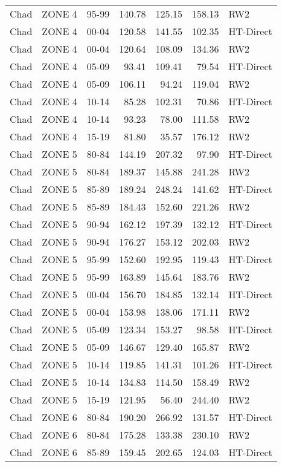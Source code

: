 \begin{longtable}{lllrrrl}
  Chad & ZONE 4 & 95-99 & 140.78 & 125.15 & 158.13 & RW2 \\ 
  Chad & ZONE 4 & 00-04 & 120.58 & 141.55 & 102.35 & HT-Direct \\ 
  Chad & ZONE 4 & 00-04 & 120.64 & 108.09 & 134.36 & RW2 \\ 
  Chad & ZONE 4 & 05-09 & 93.41 & 109.41 & 79.54 & HT-Direct \\ 
  Chad & ZONE 4 & 05-09 & 106.11 & 94.24 & 119.04 & RW2 \\ 
  Chad & ZONE 4 & 10-14 & 85.28 & 102.31 & 70.86 & HT-Direct \\ 
  Chad & ZONE 4 & 10-14 & 93.23 & 78.00 & 111.58 & RW2 \\ 
  Chad & ZONE 4 & 15-19 & 81.80 & 35.57 & 176.12 & RW2 \\ 
  Chad & ZONE 5 & 80-84 & 144.19 & 207.32 & 97.90 & HT-Direct \\ 
  Chad & ZONE 5 & 80-84 & 189.37 & 145.88 & 241.28 & RW2 \\ 
  Chad & ZONE 5 & 85-89 & 189.24 & 248.24 & 141.62 & HT-Direct \\ 
  Chad & ZONE 5 & 85-89 & 184.43 & 152.60 & 221.26 & RW2 \\ 
  Chad & ZONE 5 & 90-94 & 162.12 & 197.39 & 132.12 & HT-Direct \\ 
  Chad & ZONE 5 & 90-94 & 176.27 & 153.12 & 202.03 & RW2 \\ 
  Chad & ZONE 5 & 95-99 & 152.60 & 192.95 & 119.43 & HT-Direct \\ 
  Chad & ZONE 5 & 95-99 & 163.89 & 145.64 & 183.76 & RW2 \\ 
  Chad & ZONE 5 & 00-04 & 156.70 & 184.85 & 132.14 & HT-Direct \\ 
  Chad & ZONE 5 & 00-04 & 153.98 & 138.06 & 171.11 & RW2 \\ 
  Chad & ZONE 5 & 05-09 & 123.34 & 153.27 & 98.58 & HT-Direct \\ 
  Chad & ZONE 5 & 05-09 & 146.67 & 129.40 & 165.87 & RW2 \\ 
  Chad & ZONE 5 & 10-14 & 119.85 & 141.31 & 101.26 & HT-Direct \\ 
  Chad & ZONE 5 & 10-14 & 134.83 & 114.50 & 158.49 & RW2 \\ 
  Chad & ZONE 5 & 15-19 & 121.95 & 56.40 & 244.40 & RW2 \\ 
  Chad & ZONE 6 & 80-84 & 190.20 & 266.92 & 131.57 & HT-Direct \\ 
  Chad & ZONE 6 & 80-84 & 175.28 & 133.38 & 230.10 & RW2 \\ 
  Chad & ZONE 6 & 85-89 & 159.45 & 202.65 & 124.03 & HT-Direct \\ 

\end{longtable}
